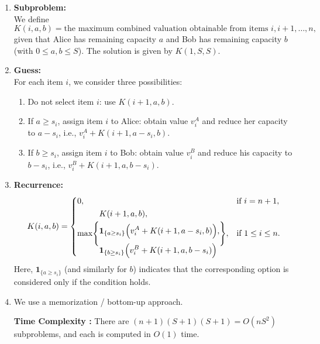 \documentclass[11pt]{article}
\begin{document}
    \begin{enumerate}
        \item \textbf{Subproblem:}\\
        We define 
        \[
        K(i,a,b) = \text{the maximum combined valuation obtainable from items } i,i+1,\dots,n,
        \]
        given that Alice has remaining capacity \(a\) and Bob has remaining capacity \(b\) (with \(0\le a,b\le S\)). 
        The solution is given by \(K(1,S,S)\).
    
        \item \textbf{Guess:}\\
        For each item \(i\), we consider three possibilities:
        \begin{enumerate}
            \item Do not select item \(i\): use \(K(i+1,a,b)\).
            \item If \(a\ge s_i\), assign item \(i\) to Alice: obtain value \(v_i^A\) and reduce her capacity to \(a-s_i\), i.e., \(v_i^A+K(i+1,a-s_i,b)\).
            \item If \(b\ge s_i\), assign item \(i\) to Bob: obtain value \(v_i^B\) and reduce his capacity to \(b-s_i\), i.e., \(v_i^B+K(i+1,a,b-s_i)\).
        \end{enumerate}
    
        \item \textbf{Recurrence:}\\[1mm]
        \[
        K(i,a,b)=
        \begin{cases}
        0, & \text{if } i = n+1,\\[1mm]
        \max\Biggl\{
        \begin{aligned}
        &K(i+1,a,b),\\[1mm]
        &\mathbf{1}_{\{a\ge s_i\}}\Bigl(v_i^A + K(i+1,a-s_i,b)\Bigr),\\[1mm]
        &\mathbf{1}_{\{b\ge s_i\}}\Bigl(v_i^B + K(i+1,a,b-s_i)\Bigr)
        \end{aligned}
        \Biggr\}, & \text{if } 1\le i\le n.
        \end{cases}
        \]
        Here, \(\mathbf{1}_{\{a\ge s_i\}}\) (and similarly for \(b\)) indicates that the corresponding option is considered only if the condition holds.
    
        \item We use a memorization / bottom-up approach. 
        
            \textbf{Time Complexity :}
            There are \((n+1)(S+1)(S+1)=O(nS^2)\) subproblems, and each is computed in \(O(1)\) time. 


\end{enumerate}
\end{document}

